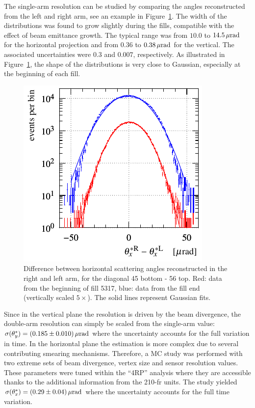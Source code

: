 The single-arm resolution can be studied by comparing the angles reconstructed from the left and right arm, see an example in Figure~\ref{fig:resol x 1a}. The width of the distributions was found to grow slightly during the fills, compatible with the effect of beam emittance growth. The typical range was from $10.0$ to $14.5\,{\rm \mu rad}$ for the horizontal projection and from $0.36$ to $0.38\,{\rm \mu rad}$ for the vertical. The associated uncertainties were $0.3$ and $0.007$, respectively. As illustrated in Figure~\ref{fig:resol x 1a}, the shape of the distributions is very close to Gaussian, especially at the beginning of each fill.

\begin{figure}
\begin{center}
\includegraphics{fig/resolution_non_gaussianity.pdf}
\caption{%
Difference between horizontal scattering angles reconstructed in the right and left arm, for the diagonal 45 bottom - 56 top. Red: data from the beginning of fill 5317, blue: data from the fill end (vertically scaled $5\times$). The solid lines represent Gaussian fits.
}
\label{fig:resol x 1a}
\end{center}
\end{figure}

Since in the vertical plane the resolution is driven by the beam divergence, the double-arm resolution can simply be scaled from the single-arm value: $\sigma(\theta^*_y) = (0.185 \pm 0.010)\,{\rm \mu rad}$ where the uncertainty accounts for the full variation in time. In the horizontal plane the estimation is more complex due to several contributing smearing mechanisms. Therefore, a MC study was performed with two extreme sets of beam divergence, vertex size and sensor resolution values. These parameters were tuned within the ``4RP'' analysis where they are accessible thanks to the additional information from the 210-fr units. The study yielded $\sigma(\theta^*_x) =  (0.29 \pm 0.04)\,{\rm \mu rad}$ where the uncertainty accounts for the full time variation.


